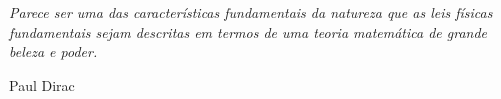 \clearpage
\vspace*{6in}
\epigraph{\emph{Parece ser uma das características fundamentais da natureza que as leis físicas fundamentais sejam descritas em termos de uma teoria matemática de grande beleza e poder.}}{Paul Dirac}
